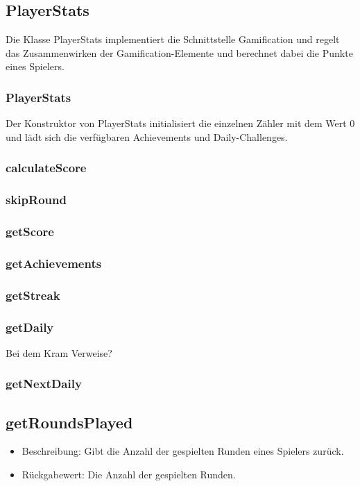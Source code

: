 \documentclass[a4paper]{scrreprt}
\begin{document}
	\subsection{PlayerStats}
	Die Klasse PlayerStats implementiert die Schnittstelle Gamification und regelt das Zusammenwirken der Gamification-Elemente und berechnet dabei die Punkte eines Spielers.

	\subsubsection{PlayerStats}
	Der Konstruktor von PlayerStats initialisiert die einzelnen Zähler mit dem Wert 0 und lädt sich die verfügbaren Achievements und Daily-Challenges.
	\subsubsection{calculateScore}
	\subsubsection{skipRound}
	\subsubsection{getScore}
	\subsubsection{getAchievements}
	\subsubsection{getStreak}
	\subsubsection{getDaily}
	Bei dem Kram Verweise?
	\subsubsection{getNextDaily}
	\subsection{getRoundsPlayed}
	\begin{itemize}
		\item Beschreibung: Gibt die Anzahl der gespielten Runden eines Spielers zurück.
		\item Rückgabewert: Die Anzahl der gespielten Runden.
	\end{itemize}
\end{document}
